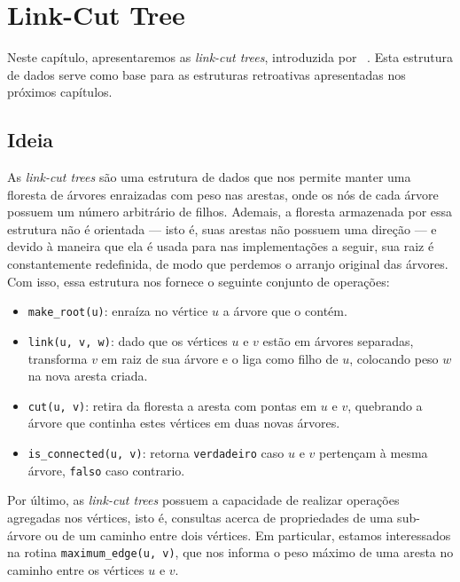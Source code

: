 
\chapter{Link-Cut Tree}
\label{cap:link-cut-trees}

Neste capítulo, apresentaremos as \emph{link-cut trees}, introduzida por ~\citet{10.1145/800076.802464}. Esta estrutura de dados serve como base para as estruturas retroativas apresentadas nos próximos capítulos.

\section{Ideia}
\label{sec:lct-ideia}

As \emph{link-cut trees} são uma estrutura de dados que nos permite manter uma floresta de árvores enraizadas com peso nas arestas, onde os nós de cada árvore possuem um número arbitrário de filhos. Ademais, a floresta armazenada por essa estrutura não é orientada --- isto é, suas arestas não possuem uma direção --- e devido à maneira que ela é usada para nas implementações a seguir, sua raiz é constantemente redefinida, de modo que perdemos o arranjo original das árvores. Com isso, essa estrutura nos fornece o seguinte conjunto de operações:

\begin{itemize}
    \item \texttt{make\_root(u)}: enraíza no vértice $u$ a árvore que o contém.
    \item \texttt{link(u, v, w)}: dado que os vértices $u$ e $v$ estão em árvores separadas, transforma $v$ em raiz de sua árvore e o liga como filho de $u$, colocando peso $w$ na nova aresta criada.
    \item \texttt{cut(u, v)}: retira da floresta a aresta com pontas em $u$ e $v$, quebrando a árvore que continha estes vértices em duas novas árvores.
    \item \texttt{is\_connected(u, v)}: retorna \texttt{verdadeiro} caso $u$ e $v$ pertençam à mesma árvore, \texttt{falso} caso contrario.
\end{itemize}

Por último, as \emph{link-cut trees} possuem a capacidade de realizar operações agregadas nos vértices, isto é, consultas acerca de propriedades de uma sub-árvore ou de um caminho entre dois vértices. Em particular, estamos interessados na rotina \texttt{maximum\_edge(u, v)}, que nos informa o peso máximo de uma aresta no caminho entre os vértices $u$ e $v$.

